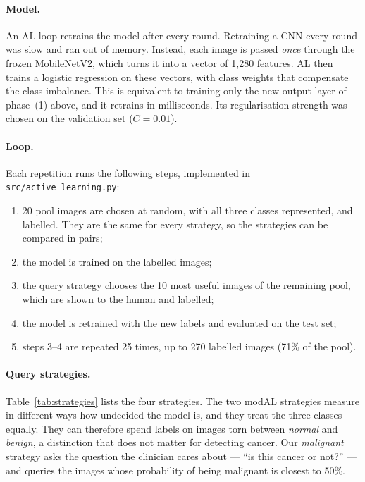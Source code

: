 \documentclass{article}
\begin{document}
\paragraph{Model.} An AL loop retrains the model after every round. Retraining a CNN every
round was slow and ran out of memory. Instead, each image is passed \emph{once} through the
frozen MobileNetV2, which turns it into a vector of 1{,}280 features. AL then trains a
logistic regression on these vectors, with class weights that compensate the class
imbalance. This is equivalent to training only the new output layer of phase~(1) above, and
it retrains in milliseconds. Its regularisation strength was chosen on the validation set
($C=0.01$).

\paragraph{Loop.} Each repetition runs the following steps, implemented in
\texttt{src/active\_learning.py}:
\begin{enumerate}
\item 20 pool images are chosen at random, with all three classes represented, and
labelled. They are the same for every strategy, so the strategies can be compared in pairs;
\item the model is trained on the labelled images;
\item the query strategy chooses the 10 most useful images of the remaining pool, which are
shown to the human and labelled;
\item the model is retrained with the new labels and evaluated on the test set;
\item steps 3--4 are repeated 25 times, up to 270 labelled images (71\% of the pool).
\end{enumerate}

\paragraph{Query strategies.} Table~\ref{tab:strategies} lists the four strategies. The
two modAL strategies measure in different ways how undecided the model is, and they treat
the three classes equally. They can therefore spend labels on images torn between
\emph{normal} and \emph{benign}, a distinction that does not matter for detecting cancer.
Our \emph{malignant} strategy asks the question the clinician cares about --- ``is this
cancer or not?'' --- and queries the images whose probability of being malignant is
closest to 50\%.
\end{document}
